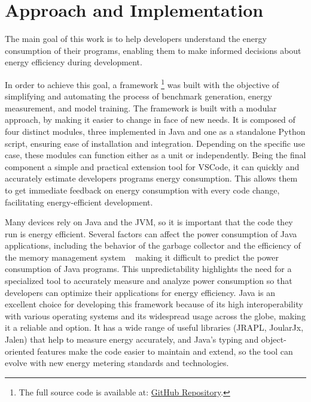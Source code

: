 \chapter{Approach and Implementation}\label{chapter:approach}



The main goal of this work is to help developers understand the energy consumption of their programs, enabling them to make informed decisions about energy efficiency during development.

In order to achieve this goal, a framework \footnote{The full source code is available at: \href{https://github.com/afonsoCarreira1/EnergyAwareProgramming}{GitHub Repository}.} was built with the objective of simplifying and automating the process of benchmark generation, energy measurement, and model training. The framework is built with a modular approach, by making it easier to change in face of new needs. It is composed of four distinct modules, three implemented in Java and one as a standalone Python script, ensuring ease of installation and integration. Depending on the specific use case, these modules can function either as a unit or independently. Being the final component a simple and practical extension tool for VSCode, it can quickly and accurately estimate developers programs energy consumption. This allows them to get immediate feedback on energy consumption with every code change, facilitating energy-efficient development.




Many devices rely on Java and the JVM, so it is important that the code they run is energy efficient. Several factors can affect the power consumption of Java applications, including the behavior of the garbage collector and the efficiency of the memory management system ~\cite{10.5555/1267847.1267870} making it difficult to predict the power consumption of Java programs. This unpredictability highlights the need for a specialized tool to accurately measure and analyze power consumption so that developers can optimize their applications for energy efficiency.
Java is an excellent choice for developing this framework because of its high interoperability with various operating systems and its widespread usage across the globe, making it a reliable and option. It has a wide range of useful libraries (JRAPL, JoularJx, Jalen) that help to measure energy accurately, and Java's typing and object-oriented features make the code easier to maintain and extend, so the tool can evolve with new energy metering standards and technologies.

